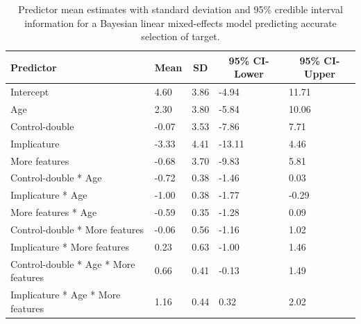 \documentclass[man]{apa6}
\theoremstyle{definition}
\theoremstyle{definition}
\theoremstyle{definition}
\theoremstyle{remark}
\begin{document}
\begin{table}[tbp]
\begin{center}
\begin{threeparttable}
\caption{\label{tab:brmacc}Predictor mean estimates with standard deviation and 95\% credible interval information for a Bayesian linear mixed-effects model predicting accurate selection of target.}
\begin{tabular}{lllll}
\toprule
Predictor & \multicolumn{1}{c}{Mean} & \multicolumn{1}{c}{SD} & \multicolumn{1}{c}{95\% CI-Lower} & \multicolumn{1}{c}{95\% CI-Upper}\\
\midrule
Intercept & 4.60 & 3.86 & -4.94 & 11.71\\
Age & 2.30 & 3.80 & -5.84 & 10.06\\
Control-double & -0.07 & 3.53 & -7.86 & 7.71\\
Implicature & -3.33 & 4.41 & -13.11 & 4.46\\
More features & -0.68 & 3.70 & -9.83 & 5.81\\
Control-double * Age & -0.72 & 0.38 & -1.46 & 0.03\\
Implicature * Age & -1.00 & 0.38 & -1.77 & -0.29\\
More features * Age & -0.59 & 0.35 & -1.28 & 0.09\\
Control-double * More features & -0.06 & 0.56 & -1.16 & 1.02\\
Implicature * More features & 0.23 & 0.63 & -1.00 & 1.46\\
Control-double * Age * More features & 0.66 & 0.41 & -0.13 & 1.49\\
Implicature * Age * More features & 1.16 & 0.44 & 0.32 & 2.02\\
\bottomrule
\end{tabular}
\end{threeparttable}
\end{center}
\end{table}
\end{document}
